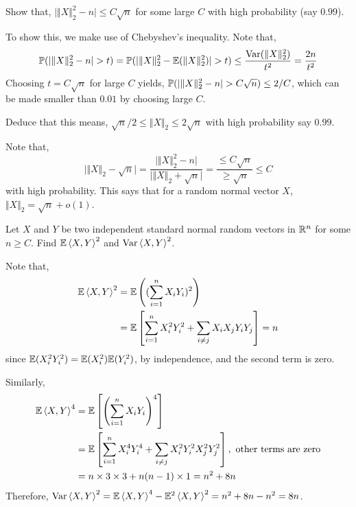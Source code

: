 \documentclass[12pt]{article}
\begin{document}
\begin{exercisebox}[Continued]
    Show that, $\vert \Vert X\Vert_2^2 - n\vert \leq C \sqrt{n}$ for some large $C$ with high probability (say $0.99$).

    To show this, we make use of Chebyshev's inequality. Note that,
    \begin{equation*}
        \mathbb{P}(\vert \Vert X\Vert_2^2 - n\vert > t) = \mathbb{P}(\vert \Vert X\Vert_2^2 - \mathbb{E}(\Vert X\Vert_2^2) \vert > t) \leq \dfrac{\mathrm{Var}(\Vert X\Vert_2^2)}{t^2} = \dfrac{2n}{t^2}
    \end{equation*}
    \noindent Choosing $t = C\sqrt{n}$ for large $C$ yields, $\mathbb{P}(\vert \Vert X\Vert_2^2 - n\vert > C\sqrt{n}) \leq 2/C$, which can be made smaller than $0.01$ by choosing large $C$.
\end{exercisebox}

\begin{exercisebox}[Continued]
    Deduce that this means, $\sqrt{n}/2 \leq \Vert X\Vert_2 \leq 2\sqrt{n}$ with high probability say $0.99$.

    Note that,
    \begin{equation*}
        \vert \Vert X\Vert_2 - \sqrt{n} \vert = \dfrac{\vert \Vert X\Vert_2^2 - n \vert}{\vert \Vert X\Vert_2 + \sqrt{n} \vert} = \dfrac{\leq C\sqrt{n}}{\geq \sqrt{n}} \leq C
    \end{equation*}
    \noindent with high probability. This says that for a random normal vector $X$, $\Vert X\Vert_2 = \sqrt{n} + o(1)$.
\end{exercisebox}

\begin{exercisebox}
    Let $X$ and $Y$ be two independent standard normal random vectors in $\mathbb{R}^n$ for some $n \geq C$. Find $\mathbb{E}\left\langle X,Y \right\rangle^2$ and $\mathrm{Var}\left\langle X,Y \right\rangle^2$.

    Note that,
    \begin{align*}
        \mathbb{E}\left\langle X,Y \right\rangle^2
         & = \mathbb{E}\left( (\sum_{i=1}^n X_i Y_i)^2 \right)                                    \\
         & = \mathbb{E}\left[ \sum_{i=1}^n X_i^2 Y_i^2 + \sum_{i \neq j} X_iX_jY_iY_j \right] = n
    \end{align*}
    \noindent since $\mathbb{E}(X_i^2Y_i^2) = \mathbb{E}(X_i^2)\mathbb{E}(Y_i^2)$, by independence, and the second term is zero.

    Similarly,
    \begin{align*}
        \mathbb{E}\left\langle X,Y \right\rangle^4
         & = \mathbb{E}\left[ \left( \sum_{i=1}^n X_iY_i \right)^4 \right]                                                             \\
         & = \mathbb{E}\left[ \sum_{i=1}^n X_i^4 Y_i^4 + \sum_{i \neq j} X_i^2 Y_i^2 X_j^2 Y_j^2 \right], \text{ other terms are zero} \\
         & = n \times 3 \times 3 + n(n-1) \times 1 = n^2 + 8n
    \end{align*}
    \noindent Therefore, $\mathrm{Var}\left\langle X,Y \right\rangle^2 = \mathbb{E}\left\langle X,Y \right\rangle^4 - \mathbb{E}^2\left\langle X,Y \right\rangle^2 = n^2 + 8n - n^2 = 8n$.
\end{exercisebox}
\end{document}
